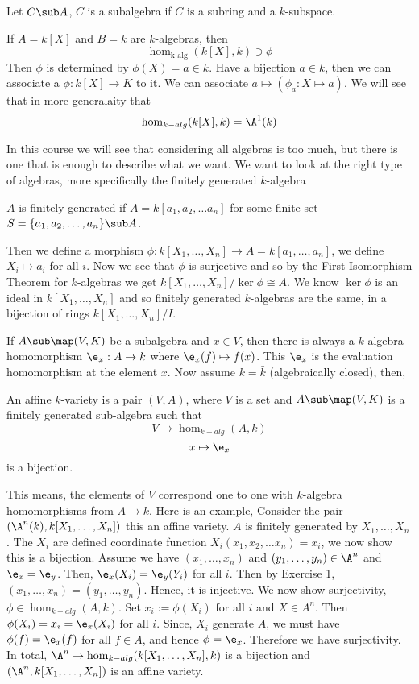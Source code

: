 \begin{ndefi}[Subalgebra]
  Let $C \sub A$, $C$ is a subalgebra if $C$ is a subring and a $k$-subspace.
\end{ndefi}

If $A = k[X]$ and $B = k$ are $k$-algebras, then
$$ \hom_{\text{k-alg}} (k[X], k) \ni \phi $$
Then $\phi$ is determined by $\phi(X) = a \in k$. Have a bijection $a \in k$, then we can associate a $\phi : k[X] \to K$ to it. We can associate $a \mapsto (\phi_a : X \mapsto a)$. We will see that in more generalaity that
$$ \hom_{k-alg}(k[X], k) = \A^1(k) $$

In this course we will see that considering all algebras is too much, but there is one that is enough to describe what we want. We want to look at the right type of algebras, more specifically the finitely generated $k$-algebra
\begin{ndefi}
  $A$ is finitely generated if $A = k[a_{1}, a_2, \dots a_n]$ for some finite set $S = \{a_1, a_2, \dots, a_n\}\sub A$.
\end{ndefi}
Then we define a morphism $\phi : k[X_1, \dots, X_n] \to A = k[a_{1}, \dots, a_n]$, we define $X_i \mapsto a_i$ for all $i$. Now we see that $\phi$ is surjective and so by the First Isomorphism Theorem for $k$-algebras we get $k[X_1, \dots, X_n]/ \ker \phi \cong A$. We know $\ker \phi$ is an ideal in $k[X_1, \dots, X_n]$ and so finitely generated $k$-algebras are the same, in a bijection of rings $k[X_1, \dots, X_n]/ I$.

If $A \sub \map (V, K)$ be a subalgebra and $x \in V$, then there is always a $k$-algebra homomorphism $\e_x : A \to k$ where $\e_x (f) \mapsto f(x)$. This $\e_x$ is the evaluation homomorphism at the element $x$. Now assume $k = \bar k$ (algebraically closed), then,
\begin{ndefi}
  An affine $k$-variety is a pair $(V, A)$, where $V$ is a set and $A\sub \map(V, K)$ is a finitely generated sub-algebra such that
  $$ V \to \hom_{k-alg}(A, k) $$
  $$ x \mapsto \e_x $$
  is a bijection.
\end{ndefi}

This means, the elements of $V$ correspond one to one with $k$-algebra homomorphisms from $A \to k$. Here is an example, Consider the pair $(\A^n(k), k[X_1, \dots, X_n])$ this an affine variety. $A$ is finitely generated by $X_1, \dots, X_n$. The $X_i$ are defined coordinate function $X_i(x_1, x_2, \dots x_n) = x_i$, we now show this is a bijection. Assume we have $(x_1, \dots, x_n)$ and $(y_1, \dots, y_n) \in \A^n$ and $\e_x = \e_y$. Then, $\e_x(X_i) = \e_y(Y_i)$ for all $i$. Then by Exercise 1, $(x_1,  \dots, x_n) = (y_1, \dots, y_n)$. Hence, it is injective.
We now show surjectivity, $\phi \in \hom_{k-alg}(A, k)$. Set $x_i := \phi(X_i)$ for all $i$ and $X \in A^n$. Then $\phi(X_i) = x_i = \e_x(X_i)$ for all $i$. Since, $X_i$ generate $A$, we must have $\phi(f) = \e_x(f)$ for all $f \in A$, and hence $\phi = \e_x$. Therefore we have surjectivity. In total, $\A^n \to \hom_{k-alg}(k[X_1, \dots, X_n], k)$ is a bijection and $(\A^n, k[X_1, \dots, X_n])$ is an affine variety.

